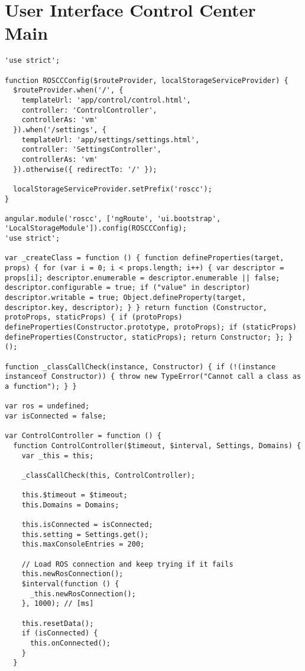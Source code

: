 \section{User Interface Control Center Main}
\begin{verbatim}
'use strict';

function ROSCCConfig($routeProvider, localStorageServiceProvider) {
  $routeProvider.when('/', {
    templateUrl: 'app/control/control.html',
    controller: 'ControlController',
    controllerAs: 'vm'
  }).when('/settings', {
    templateUrl: 'app/settings/settings.html',
    controller: 'SettingsController',
    controllerAs: 'vm'
  }).otherwise({ redirectTo: '/' });

  localStorageServiceProvider.setPrefix('roscc');
}

angular.module('roscc', ['ngRoute', 'ui.bootstrap', 'LocalStorageModule']).config(ROSCCConfig);
'use strict';

var _createClass = function () { function defineProperties(target, props) { for (var i = 0; i < props.length; i++) { var descriptor = props[i]; descriptor.enumerable = descriptor.enumerable || false; descriptor.configurable = true; if ("value" in descriptor) descriptor.writable = true; Object.defineProperty(target, descriptor.key, descriptor); } } return function (Constructor, protoProps, staticProps) { if (protoProps) defineProperties(Constructor.prototype, protoProps); if (staticProps) defineProperties(Constructor, staticProps); return Constructor; }; }();

function _classCallCheck(instance, Constructor) { if (!(instance instanceof Constructor)) { throw new TypeError("Cannot call a class as a function"); } }

var ros = undefined;
var isConnected = false;

var ControlController = function () {
  function ControlController($timeout, $interval, Settings, Domains) {
    var _this = this;

    _classCallCheck(this, ControlController);

    this.$timeout = $timeout;
    this.Domains = Domains;

    this.isConnected = isConnected;
    this.setting = Settings.get();
    this.maxConsoleEntries = 200;

    // Load ROS connection and keep trying if it fails
    this.newRosConnection();
    $interval(function () {
      _this.newRosConnection();
    }, 1000); // [ms]

    this.resetData();
    if (isConnected) {
      this.onConnected();
    }
  }


\end{verbatim}

